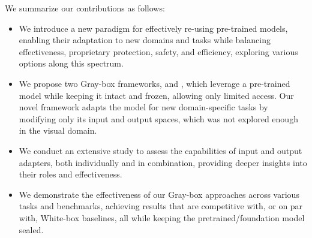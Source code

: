We summarize our contributions as follows:
\begin{itemize}
    \item We introduce a new paradigm for effectively re-using pre-trained models, enabling their adaptation to new domains and tasks while balancing effectiveness, proprietary protection, safety, and efficiency, exploring various options along this spectrum.
    
    \item We propose two Gray-box frameworks, \ours and \oursp, which leverage a pre-trained model while keeping it intact and frozen, allowing only limited access. Our novel \oursFull framework adapts the model for new domain-specific tasks by modifying only its input and output spaces, which was not explored enough in the visual domain.
    
    \item We conduct an extensive study to assess the capabilities of input and output adapters, both individually and in combination, providing deeper insights into their roles and effectiveness.
    
    \item We demonstrate the effectiveness of our Gray-box approaches across various tasks and benchmarks, achieving results that are competitive with, or on par with, White-box baselines, all while keeping the pretrained/foundation model sealed.
\end{itemize}

